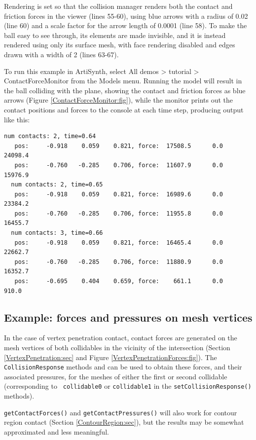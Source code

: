 Rendering is set so that the collision manager renders both the
contact and friction forces in the viewer (lines 55-60), using blue
arrows with a radius of 0.02 (line 60) and a scale factor for the
arrow length of 0.0001 (line 58). To make the ball easy to see
through, its elements are made invisible, and it is instead rendered
using only its surface mesh, with face rendering disabled and edges
drawn with a width of 2 (lines 63-67).

To run this example in ArtiSynth, select {\sf All demos > tutorial >
ContactForceMonitor} from the {\sf Models} menu. Running the model
will result in the ball colliding with the plane, showing the contact
and friction forces as blue arrows
(Figure \ref{ContactForceMonitor:fig}), while the monitor prints out
the contact positions and forces to the console at each time step,
producing output like this:
%
\begin{lstlisting}[]
  num contacts: 2, time=0.64
   pos:     -0.918    0.059    0.821, force:  17508.5      0.0  24098.4
   pos:     -0.760   -0.285    0.706, force:  11607.9      0.0  15976.9
  num contacts: 2, time=0.65
   pos:     -0.918    0.059    0.821, force:  16989.6      0.0  23384.2
   pos:     -0.760   -0.285    0.706, force:  11955.8      0.0  16455.7
  num contacts: 3, time=0.66
   pos:     -0.918    0.059    0.821, force:  16465.4      0.0  22662.7
   pos:     -0.760   -0.285    0.706, force:  11880.9      0.0  16352.7
   pos:     -0.695    0.404    0.659, force:    661.1      0.0    910.0
\end{lstlisting}
%

\subsection{Example: forces and pressures on mesh vertices}

In the case of vertex penetration contact, contact forces are generated on the
mesh vertices of both collidables in the vicinity of the intersection (Section
\ref{VertexPenetration:sec} and Figure \ref{VertexPenetrationForces:fig}).
The {\tt CollisionResponse} methods
and
can be used to obtain these forces, and their associated pressures, for the
meshes of either the first or second collidable (corresponding to {\tt
collidable0} or {\tt collidable1} in the {\tt setCollisionResponse()} methods).

\begin{sideblock}
{\tt getContactForces()} and {\tt getContactPressures()} will also work for
contour region contact (Section \ref{ContourRegion:sec}), but the results may
be somewhat approximated and less meaningful.
\end{sideblock}

